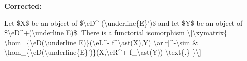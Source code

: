 \documentclass[oneside]{book}
\theoremstyle{sga-source}
\theoremstyle{sga-source-dash}
\theoremstyle{sga-source-dotdash}
\theoremstyle{sga-source-number-note-dash}
\theoremstyle{sga-source-note-number-dotdash}
\theoremstyle{sga-source-example-dotdash}
\theoremstyle{sga-source-inline-number}
\theoremstyle{sga-source-bare-number}
\theoremstyle{sga-source}
\begin{document}
\begin{description}
\par\noindent\textbf{Corrected:} {\footnotesize\ttfamily\raggedright Let \$X\$ be an object of \$\textbackslash{}\allowbreak{}eD\textasciicircum{}\allowbreak{}-\allowbreak{}(\allowbreak{}\textbackslash{}\allowbreak{}underline\{\allowbreak{}E\}\allowbreak{}')\allowbreak{}\$ and let \$Y\$ be an object of \$\textbackslash{}\allowbreak{}eD\textasciicircum{}\allowbreak{}+\allowbreak{}(\allowbreak{}\textbackslash{}\allowbreak{}underline E)\allowbreak{}\$. There is a functorial isomorphism \textbackslash{}\allowbreak{}[\allowbreak{}\textbackslash{}\allowbreak{}xymatrix\{\allowbreak{}   \textbackslash{}\allowbreak{}hom\_\allowbreak{}\{\allowbreak{}\textbackslash{}\allowbreak{}eD(\allowbreak{}\textbackslash{}\allowbreak{}underline E)\allowbreak{}\}\allowbreak{}(\allowbreak{}\textbackslash{}\allowbreak{}eL\textasciicircum{}\allowbreak{}-\allowbreak{} f\textasciicircum{}\allowbreak{}\textbackslash{}\allowbreak{}ast(\allowbreak{}X)\allowbreak{},\allowbreak{}Y)\allowbreak{} \textbackslash{}\allowbreak{}ar[\allowbreak{}r]\allowbreak{}\textasciicircum{}\allowbreak{}-\allowbreak{}\textbackslash{}\allowbreak{}sim     \& \textbackslash{}\allowbreak{}hom\_\allowbreak{}\{\allowbreak{}\textbackslash{}\allowbreak{}eD(\allowbreak{}\textbackslash{}\allowbreak{}underline\{\allowbreak{}E\}\allowbreak{}')\allowbreak{}\}\allowbreak{}(\allowbreak{}X,\allowbreak{}\textbackslash{}\allowbreak{}eR\textasciicircum{}\allowbreak{}+\allowbreak{} f\_\allowbreak{}\textbackslash{}\allowbreak{}ast(\allowbreak{}Y)\allowbreak{})\allowbreak{} \textbackslash{}\allowbreak{}text\{\allowbreak{}.\}\allowbreak{} \}\allowbreak{}\textbackslash{}\allowbreak{}]\allowbreak{}\par}
\smallskip
\end{description}
\endgroup
\fi
\end{document}
